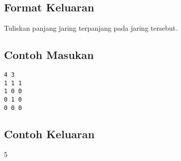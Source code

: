 \documentclass{article}
\begin{document}
\subsection*{Format Keluaran}

Tuliskan panjang jaring terpanjang pada jaring tersebut.

\begin{multicols}{2}
\subsection*{Contoh Masukan}
\begin{lstlisting}
4 3
1 1 1
1 0 0
0 1 0
0 0 0
\end{lstlisting}
\columnbreak
\subsection*{Contoh Keluaran}
5
\vfill
\null
\end{multicols}
\pagebreak
\end{document}
